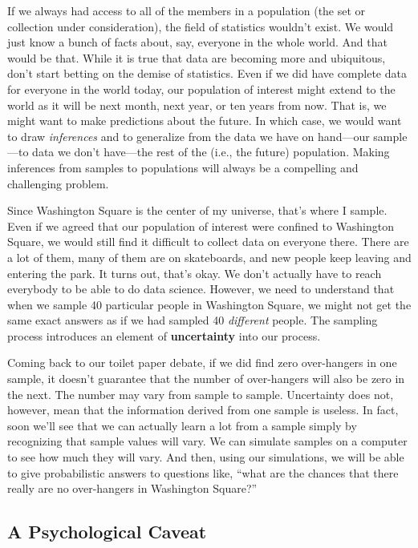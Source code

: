 \documentclass[openany]{book}
\begin{document}
If we always had access to all of the members in a population (the set or collection under consideration), the field of statistics wouldn't exist. We would just know a bunch of facts about, say, everyone in the whole world. And that would be that. While it is true that data are becoming more and ubiquitous, don't start betting on the demise of statistics. Even if we did have complete data for everyone in the world today, our population of interest might extend to the world as it will be next month, next year, or ten years from now. That is, we might want to make predictions about the future. In which case, we would want to draw \emph{inferences} and to generalize from the data we have on hand---our sample---to data we don't have---the rest of the (i.e., the future) population. Making inferences from samples to populations will always be a compelling and challenging problem.

Since Washington Square is the center of my universe, that's where I sample. Even if we agreed that our population of interest were confined to Washington Square, we would still find it difficult to collect data on everyone there. There are a lot of them, many of them are on skateboards, and new people keep leaving and entering the park. It turns out, that's okay. We don't actually have to reach everybody to be able to do data science. However, we need to understand that when we sample 40 particular people in Washington Square, we might not get the same exact answers as if we had sampled 40 \emph{different} people. The sampling process introduces an element of \textbf{uncertainty} into our process.

Coming back to our toilet paper debate, if we did find zero over-hangers in one sample, it doesn't guarantee that the number of over-hangers will also be zero in the next. The number may vary from sample to sample. Uncertainty does not, however, mean that the information derived from one sample is useless. In fact, soon we'll see that we can actually learn a lot from a sample simply by recognizing that sample values will vary. We can simulate samples on a computer to see how much they will vary. And then, using our simulations, we will be able to give probabilistic answers to questions like, ``what are the chances that there really are no over-hangers in Washington Square?''

\hypertarget{a-psychological-caveat}{%
\subsection*{A Psychological Caveat}\label{a-psychological-caveat}}
\end{document}
